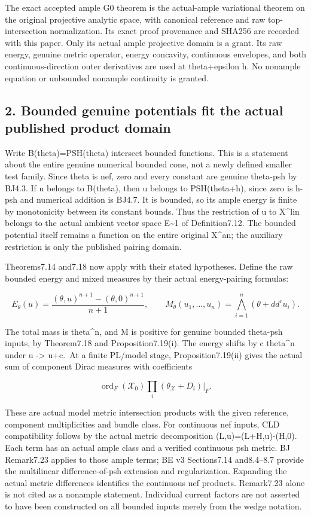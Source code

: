 \documentclass[
]{article}
\begin{document}
The exact accepted ample G0 theorem is the actual-ample variational
theorem on the original projective analytic space, with canonical
reference and raw top-intersection normalization. Its exact proof
provenance and SHA256 are recorded with this paper. Only its actual
ample projective domain is a grant. Its raw energy, genuine metric
operator, energy concavity, continuous envelopes, and both
continuous-direction outer derivatives are used at theta+epsilon h. No
nonample equation or unbounded nonample continuity is granted.

\subsection{2. Bounded genuine potentials fit the actual published
product
domain}\label{bounded-genuine-potentials-fit-the-actual-published-product-domain}

Write B(theta)=PSH(theta) intersect bounded functions. This is a
statement about the entire genuine numerical bounded cone, not a newly
defined smaller test family. Since theta is nef, zero and every constant
are genuine theta-psh by BJ4.3. If u belongs to B(theta), then u belongs
to PSH(theta+h), since zero is h-psh and numerical addition is BJ4.7. It
is bounded, so its ample energy is finite by monotonicity between its
constant bounds. Thus the restriction of u to X\^{}lin belongs to the
actual ambient vector space E\textasciitilde1 of Definition7.12. The
bounded potential itself remains a function on the entire original
X\^{}an; the auxiliary restriction is only the published pairing domain.

Theorems7.14 and7.18 now apply with their stated hypotheses. Define the
raw bounded energy and mixed measures by their actual energy-pairing
formulas:

\[E_\theta(u)=\frac{(\theta,u)^{n+1}-(\theta,0)^{n+1}}{n+1},\qquad
M_\theta(u_1,\ldots,u_n)=\bigwedge_{i=1}^n(\theta+dd^cu_i).\]

The total mass is theta\^{}n, and M is positive for genuine bounded
theta-psh inputs, by Theorem7.18 and Proposition7.19(i). The energy
shifts by c theta\^{}n under u -\textgreater{} u+c.~At a finite PL/model
stage, Proposition7.19(ii) gives the actual sum of component Dirac
measures with coefficients

\[\operatorname{ord}_F(\mathcal X_0)\prod_i(\theta_{\mathcal X}+D_i)|_F.\]

These are actual model metric intersection products with the given
reference, component multiplicities and bundle class. For continuous nef
inputs, CLD compatibility follows by the actual metric decomposition
(L,u)=(L+H,u)-(H,0). Each term has an actual ample class and a verified
continuous psh metric. BJ Remark7.23 applies to those ample terms; BE v3
Sections7.14 and8.4--8.7 provide the multilinear difference-of-psh
extension and regularization. Expanding the actual metric differences
identifies the continuous nef products. Remark7.23 alone is not cited as
a nonample statement. Individual current factors are not asserted to
have been constructed on all bounded inputs merely from the wedge
notation.
\end{document}

